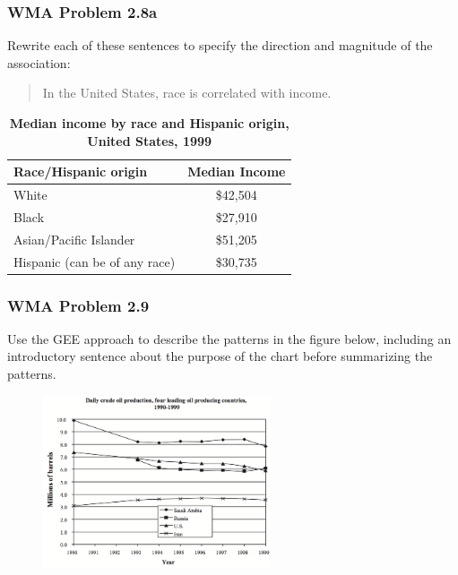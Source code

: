 \begin{frame}
    \frametitle{WMA Problem 2.8a}
    Rewrite each of these sentences to specify the direction and magnitude of
    the association:
    \vskip0.1in
    \begin{center}
    \begin{verse}
        In the United States, race is correlated with income. 
    \end{verse}
    \end{center}
    \begin{table}
        \centering
        \caption{\textbf{Median income by race and Hispanic origin, United States, 1999}}
        \label{tab:WMAex2x8}
        \begin{tabular}{lc}
        Race/Hispanic origin & Median Income \\
        \hline 
        White   & \$42,504 \\
        Black   & \$27,910 \\ 
        Asian/Pacific Islander   & \$51,205 \\ 
        Hispanic (can be of any race) & \$30,735 \\
        \hline
        \end{tabular}
    \end{table}
\end{frame}

\begin{frame}
    \frametitle{WMA Problem 2.9}
    Use the GEE approach to describe the patterns in the figure below,
    including an introductory sentence about the purpose of the chart 
    before summarizing the patterns. 
    \begin{figure}
        \begin{center}
            \includegraphics[width=0.6\textwidth]{images/WMAex2x9.png}
        \end{center}
    \end{figure}
\end{frame}

